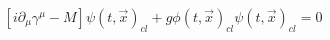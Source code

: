 \begin{equation}
\label{operator equationWyukawaclass}
\left[i \partial_{\mu}\gamma^{\mu} - M\right]\psi(t,{\vec x})_{cl} +
g \phi(t,{\vec x})_{cl} \psi(t,{\vec x})_{cl} = 0
\end{equation}

